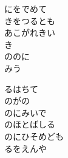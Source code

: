 \documentclass[10pt,b5j]{tarticle} %
\begin{document}
\begin{enumerate}
\begin{minipage}[c]{\blocksize}
        \vspace{\linespace}
        \item
        にをでめて\\
        きをつるとも\\
        あこがれきい\\
        き\\
        ののに\\
        みう
        
        \vspace{\linespace}
        \item
        るはちて\\
        のがの\\
        のにみいで\\
        のほとばしる\\
        のにひそめども\\
        るをえんや
    
    \end{minipage}
\end{enumerate} %
\end{document}
